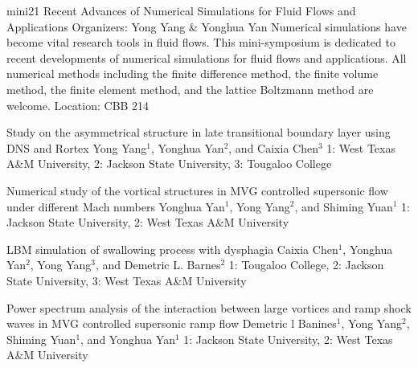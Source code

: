 \mini
{mini21}
{Recent Advances of Numerical Simulations for Fluid Flows and Applications}
{Organizers: Yong Yang \& Yonghua Yan}
{Numerical simulations have become vital research tools in fluid flows. This mini-symposium is dedicated to recent developments of numerical simulations for fluid flows and applications. All numerical methods including the finite difference method, the finite volume method, the finite element method, and the lattice Boltzmann method are welcome.}
{Location: CBB 214}

\begin{talks}
\item\talk
{Study on the asymmetrical structure in late transitional boundary layer using DNS and Rortex}
{Yong Yang$^{1}$, Yonghua Yan$^{2}$, and Caixia Chen$^{3}$}
{1: West Texas A\&M University, 2: Jackson State University, 3: Tougaloo College}
\item\talk
{Numerical study of the vortical structures in MVG controlled supersonic flow under different Mach numbers}
{Yonghua Yan$^{1}$, Yong Yang$^{2}$, and Shiming Yuan$^{1}$}
{1: Jackson State University, 2: West Texas A\&M University}
\item\talk
{LBM simulation of swallowing process with dysphagia}
{Caixia Chen$^{1}$, Yonghua Yan$^{2}$, Yong Yang$^{3}$, and Demetric L. Barnes$^{2}$}
{1: Tougaloo College, 2: Jackson State University, 3: West Texas A\&M University}
\item\talk
{Power spectrum analysis of the interaction between large vortices and ramp shock waves in MVG controlled supersonic ramp flow}
{Demetric l Banines$^{1}$, Yong Yang$^{2}$, Shiming Yuan$^{1}$, and Yonghua Yan$^{1}$}
{1: Jackson State University, 2: West Texas A\&M University}
\end{talks}
\room
